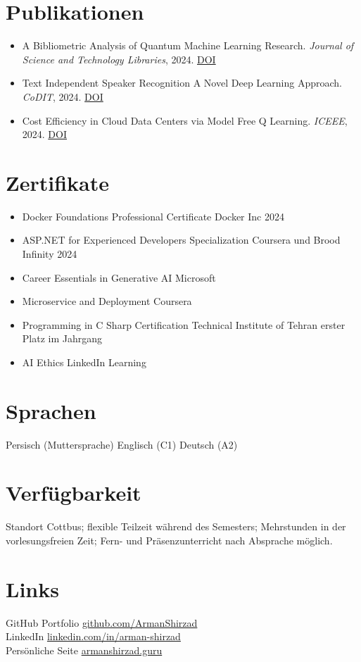 \documentclass[10pt]{article}
\begin{document}
\section*{Publikationen}
\begin{itemize}
  \item A Bibliometric Analysis of Quantum Machine Learning Research. \emph{Journal of Science and Technology Libraries}, 2024. \href{https://doi.org/10.1080/0194262X.2023.2292049}{DOI}
  \item Text Independent Speaker Recognition  A Novel Deep Learning Approach. \emph{CoDIT}, 2024. \href{https://doi.org/10.1109/CoDIT62066.2024.10708578}{DOI}
  \item Cost Efficiency in Cloud Data Centers via Model Free Q Learning. \emph{ICEEE}, 2024. \href{https://doi.org/10.1007/978-981-97-9112-5_27}{DOI}
\end{itemize}

\section*{Zertifikate}
\begin{itemize}
  \item Docker Foundations Professional Certificate  Docker Inc  2024
  \item ASP.NET for Experienced Developers Specialization  Coursera und Brood Infinity  2024
  \item Career Essentials in Generative AI  Microsoft
  \item Microservice and Deployment  Coursera
  \item Programming in C Sharp Certification  Technical Institute of Tehran  erster Platz im Jahrgang
  \item AI Ethics  LinkedIn Learning
\end{itemize}

\section*{Sprachen}
Persisch (Muttersprache) \quad Englisch (C1) \quad Deutsch (A2)

\section*{Verfügbarkeit}
Standort Cottbus; flexible Teilzeit während des Semesters; Mehrstunden in der vorlesungsfreien Zeit; Fern- und Präsenzunterricht nach Absprache möglich.

\section*{Links}
GitHub Portfolio  \href{https://github.com/ArmanShirzad}{github.com/ArmanShirzad}\\
LinkedIn  \href{https://linkedin.com/in/arman-shirzad}{linkedin.com/in/arman-shirzad}\\
Persönliche Seite  \href{https://armanshirzad.guru}{armanshirzad.guru}
\end{document}
